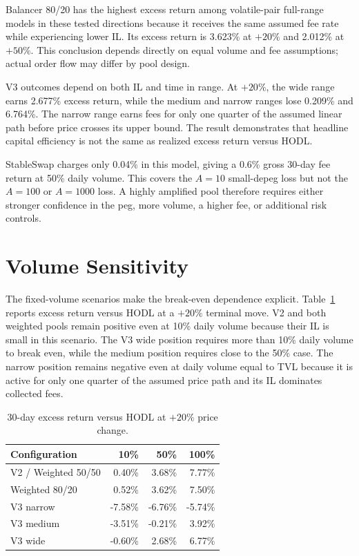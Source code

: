 \documentclass[11pt,twocolumn]{article}
\newcommand{\pct}[1]{#1\%}
\begin{document}
Balancer 80/20 has the highest excess return among volatile-pair full-range models
in these tested directions because it receives the same assumed fee rate while
experiencing lower IL. Its excess return is \pct{3.623} at $+\pct{20}$ and
\pct{2.012} at $+\pct{50}$. This conclusion depends directly on equal volume
and fee assumptions; actual order flow may differ by pool design.

V3 outcomes depend on both IL and time in range. At $+\pct{20}$, the wide
range earns \pct{2.677} excess return, while the medium and narrow ranges lose
\pct{0.209} and \pct{6.764}. The narrow range earns
fees for only one quarter of the assumed linear path before price crosses its
upper bound. The result demonstrates that headline capital efficiency is not
the same as realized excess return versus HODL.

StableSwap charges only \pct{0.04} in this model, giving a \pct{0.6} gross
30-day fee return at \pct{50} daily volume. This covers the $A=10$ small-depeg
loss but not the $A=100$ or $A=1000$ loss. A highly amplified pool therefore
requires either stronger confidence in the peg, more volume, a higher fee, or
additional risk controls.

\section{Volume Sensitivity}

The fixed-volume scenarios make the break-even dependence explicit.
Table~\ref{tab:volume} reports excess return versus HODL at a $+\pct{20}$
terminal move. V2
and both weighted pools remain positive even at \pct{10} daily volume because
their IL is small in this scenario. The V3 wide position requires more than
\pct{10} daily volume to break even, while the medium position requires close
to the \pct{50} case. The narrow position remains negative even at daily volume
equal to TVL because it is active for only one quarter of the assumed price
path and its IL dominates collected fees.

\begin{table}[!tbp]
\centering
\caption{30-day excess return versus HODL at $+\pct{20}$ price change.}
\label{tab:volume}
\small
\begin{tabular}{lrrr}
\toprule
Configuration & \pct{10} & \pct{50} & \pct{100}\\
\midrule
V2 / Weighted 50/50 & 0.40\% & 3.68\% & 7.77\%\\
Weighted 80/20 & 0.52\% & 3.62\% & 7.50\%\\
V3 narrow & -7.58\% & -6.76\% & -5.74\%\\
V3 medium & -3.51\% & -0.21\% & 3.92\%\\
V3 wide & -0.60\% & 2.68\% & 6.77\%\\
\bottomrule
\end{tabular}
\end{table}
\end{document}
